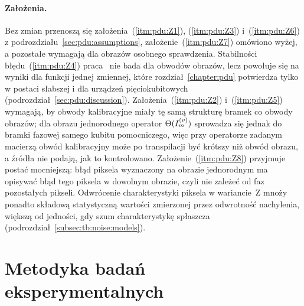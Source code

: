 \paragraph{Założenia.}\label{par:pdui:assumptions}
Bez zmian przenoszą się założenia~(\ref{itm:pdu:Z1}), (\ref{itm:pdu:Z3}) i~(\ref{itm:pdu:Z6}) z podrozdziału~\ref{sec:pdu:assumptions}, założenie~(\ref{itm:pdu:Z7}) omówiono wyżej, a pozostałe wymagają dla obrazów osobnego sprawdzenia.
Stabilności błędu~(\ref{itm:pdu:Z4}) praca~\cite{werner_error_reduction_2025} nie bada dla obwodów obrazów, lecz powołuje się na wyniki dla funkcji jednej zmiennej, które rozdział~\ref{chapter:pdu} potwierdza tylko w postaci słabszej i dla urządzeń pięciokubitowych (podrozdział~\ref{sec:pdu:discussion}).
Założenia~(\ref{itm:pdu:Z2}) i~(\ref{itm:pdu:Z5}) wymagają, by obwody kalibracyjne miały tę samą strukturę bramek co obwody obrazów; dla obrazu jednorodnego operator $\Theta(I_m^{(v)})$ sprowadza się jednak do bramki fazowej samego kubitu pomocniczego, więc przy operatorze zadanym macierzą obwód kalibracyjny może po transpilacji być krótszy niż obwód obrazu, a źródła nie podają, jak to kontrolowano.
Założenie~(\ref{itm:pdu:Z8}) przyjmuje postać mocniejszą: błąd piksela wyznaczony na obrazie jednorodnym ma opisywać błąd tego piksela w dowolnym obrazie, czyli nie zależeć od faz pozostałych pikseli.
Odwrócenie charakterystyki piksela w wariancie~Z mnoży ponadto składową statystyczną wartości zmierzonej przez odwrotność nachylenia, większą od jedności, gdy szum charakterystykę spłaszcza (podrozdział~\ref{subsec:tb:noise:models}).

\section{Metodyka badań eksperymentalnych}\label{sec:pdui:methodology}

